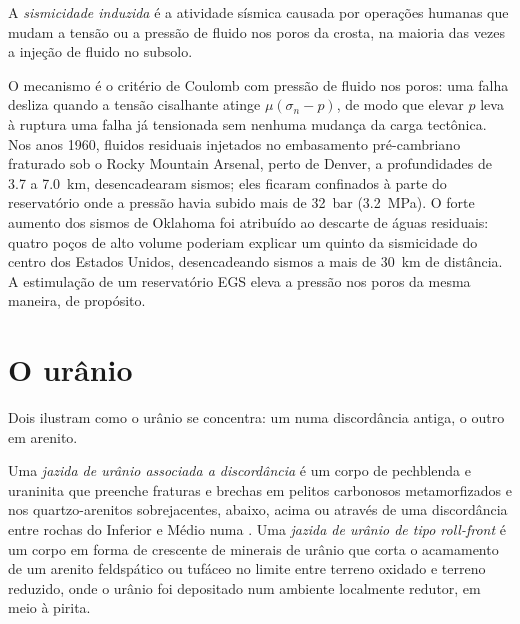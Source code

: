\begin{definition}\label{def:b2:energy-geology:induced}
A \emph{sismicidade induzida} é a atividade sísmica causada por operações
humanas que mudam a tensão ou a pressão de fluido nos poros da crosta, na maioria das vezes a
injeção de fluido no subsolo.
\end{definition}

O mecanismo é o critério de Coulomb com pressão de fluido nos poros: uma falha desliza quando a tensão cisalhante
atinge $\mu(\sigma_n - p)$, de modo que elevar $p$ leva à ruptura uma falha já tensionada
sem nenhuma mudança da carga tectônica. Nos anos 1960, fluidos residuais injetados no embasamento
pré-cambriano fraturado sob o Rocky Mountain Arsenal, perto de Denver, a profundidades de 3.7 a
\qty{7.0}{km}, desencadearam sismos; eles ficaram confinados à parte do reservatório onde a
pressão havia subido mais de \qty{32}{bar} (\qty{3.2}{MPa}). O forte aumento dos sismos
de Oklahoma foi atribuído ao descarte de águas residuais: quatro poços de alto volume
poderiam explicar um quinto da sismicidade do centro dos Estados Unidos, desencadeando
sismos a mais de \qty{30}{km} de distância. A estimulação de um reservatório EGS eleva a pressão nos poros da
mesma maneira, de propósito.

\section{O urânio}\label{sec:b2:energy-geology:uranium}

Dois  ilustram como o urânio se concentra: um numa discordância antiga, o
outro em arenito.

\begin{definition}\label{def:b2:energy-geology:uranium}
Uma \emph{jazida de urânio associada a discordância} é um corpo
de pechblenda e uraninita que preenche fraturas e brechas em pelitos carbonosos metamorfizados e
nos quartzo-arenitos sobrejacentes, abaixo, acima ou através de uma discordância entre rochas do 
Inferior e Médio numa . Uma \emph{jazida de urânio de tipo roll-front}
é um corpo em forma de crescente de minerais de urânio que corta o acamamento de um
arenito feldspático ou tufáceo no limite entre terreno oxidado e terreno reduzido, onde o
urânio foi depositado num ambiente localmente redutor, em meio à pirita.
\end{definition}

